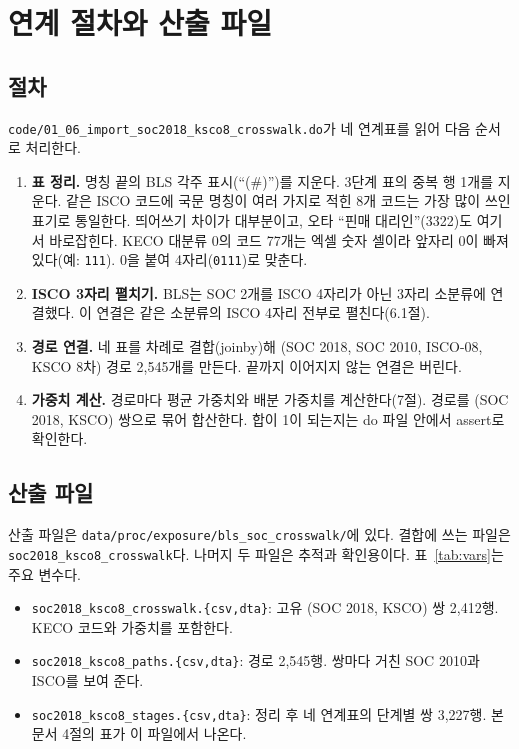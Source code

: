 \documentclass[11pt]{article}
\begin{document}
\section{연계 절차와 산출 파일}

\subsection{절차}

\texttt{code/01\_06\_import\_soc2018\_ksco8\_crosswalk.do}가 네 연계표를 읽어 다음 순서로 처리한다.
\begin{enumerate}[leftmargin=*]
  \item \textbf{표 정리.} 명칭 끝의 BLS 각주 표시(``(\#)'')를 지운다. 3단계 표의 중복 행 1개를 지운다. 같은 ISCO 코드에 국문 명칭이 여러 가지로 적힌 8개 코드는 가장 많이 쓰인 표기로 통일한다. 띄어쓰기 차이가 대부분이고, 오타 ``핀매 대리인''(3322)도 여기서 바로잡힌다. KECO 대분류 0의 코드 77개는 엑셀 숫자 셀이라 앞자리 0이 빠져 있다(예: \texttt{111}). 0을 붙여 4자리(\texttt{0111})로 맞춘다.
  \item \textbf{ISCO 3자리 펼치기.} BLS는 SOC 2개를 ISCO 4자리가 아닌 3자리 소분류에 연결했다. 이 연결은 같은 소분류의 ISCO 4자리 전부로 펼친다(6.1절).
  \item \textbf{경로 연결.} 네 표를 차례로 결합(joinby)해 (SOC 2018, SOC 2010, ISCO-08, KSCO 8차) 경로 2,545개를 만든다. 끝까지 이어지지 않는 연결은 버린다.
  \item \textbf{가중치 계산.} 경로마다 평균 가중치와 배분 가중치를 계산한다(7절). 경로를 (SOC 2018, KSCO) 쌍으로 묶어 합산한다. 합이 1이 되는지는 do 파일 안에서 assert로 확인한다.
\end{enumerate}

\subsection{산출 파일}

산출 파일은 \texttt{data/proc/exposure/bls\_soc\_crosswalk/}에 있다. 결합에 쓰는 파일은 \texttt{soc2018\_ksco8\_crosswalk}다. 나머지 두 파일은 추적과 확인용이다. 표~\ref{tab:vars}는 주요 변수다.
\begin{itemize}[leftmargin=*]
  \item \texttt{soc2018\_ksco8\_crosswalk.\{csv,dta\}}: 고유 (SOC 2018, KSCO) 쌍 2,412행. KECO 코드와 가중치를 포함한다.
  \item \texttt{soc2018\_ksco8\_paths.\{csv,dta\}}: 경로 2,545행. 쌍마다 거친 SOC 2010과 ISCO를 보여 준다.
  \item \texttt{soc2018\_ksco8\_stages.\{csv,dta\}}: 정리 후 네 연계표의 단계별 쌍 3,227행. 본 문서 4절의 표가 이 파일에서 나온다.
\end{itemize}
\end{document}
